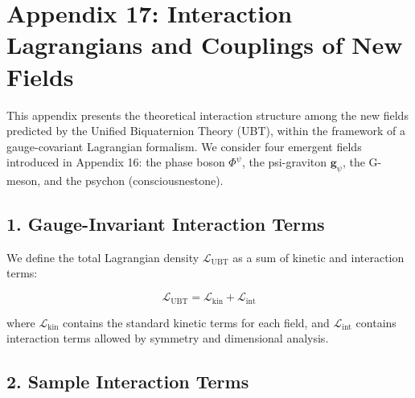 

\appendix
\section*{Appendix 17: Interaction Lagrangians and Couplings of New Fields}

This appendix presents the theoretical interaction structure among the new fields predicted by the Unified Biquaternion Theory (UBT), within the framework of a gauge-covariant Lagrangian formalism. We consider four emergent fields introduced in Appendix 16: the phase boson $\Phi^\psi$, the psi-graviton $\mathbf{g}_\psi$, the G-meson, and the psychon (consciousnestone).

\subsection*{1. Gauge-Invariant Interaction Terms}

We define the total Lagrangian density $\mathcal{L}_\text{UBT}$ as a sum of kinetic and interaction terms:

\[
\mathcal{L}_\text{UBT} = \mathcal{L}_\text{kin} + \mathcal{L}_\text{int}
\]

where $\mathcal{L}_\text{kin}$ contains the standard kinetic terms for each field, and $\mathcal{L}_\text{int}$ contains interaction terms allowed by symmetry and dimensional analysis.

\subsection*{2. Sample Interaction Terms}

